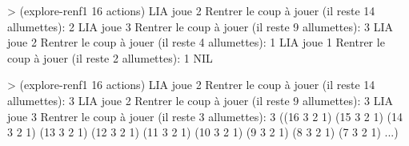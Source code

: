 \documentclass[
]{article}
\newenvironment{Shaded}{}{}
\newcommand{\DecValTok}[1]{\textcolor[rgb]{0.25,0.63,0.44}{#1}}
\newcommand{\NormalTok}[1]{#1}
\newcommand{\OperatorTok}[1]{\textcolor[rgb]{0.40,0.40,0.40}{#1}}
\begin{document}
\begin{Shaded}
    \begin{algorithm}[H]
\begin{Highlighting}[]
\OperatorTok{\textgreater{}}\NormalTok{ (explore{-}renf1 }\DecValTok{16}\NormalTok{ actions)}
\NormalTok{L\textquotesingle{}IA joue }\DecValTok{2} 
\NormalTok{Rentrer le coup à jouer (il reste }\DecValTok{14}\NormalTok{ allumettes): }
\DecValTok{2}
\NormalTok{L\textquotesingle{}IA joue }\DecValTok{3} 
\NormalTok{Rentrer le coup à jouer (il reste }\DecValTok{9}\NormalTok{ allumettes): }
\DecValTok{3}
\NormalTok{L\textquotesingle{}IA joue }\DecValTok{2} 
\NormalTok{Rentrer le coup à jouer (il reste }\DecValTok{4}\NormalTok{ allumettes): }
\DecValTok{1}
\NormalTok{L\textquotesingle{}IA joue }\DecValTok{1} 
\NormalTok{Rentrer le coup à jouer (il reste }\DecValTok{2}\NormalTok{ allumettes): }
\DecValTok{1}
\NormalTok{NIL}
\end{Highlighting}
\end{algorithm}
\end{Shaded}
\pagebreak
\begin{Shaded}
    \begin{algorithm}[H]
    \begin{Highlighting}[]
\OperatorTok{\textgreater{}}\NormalTok{ (explore{-}renf1 }\DecValTok{16}\NormalTok{ actions)}
\NormalTok{L\textquotesingle{}IA joue }\DecValTok{2} 
\NormalTok{Rentrer le coup à jouer (il reste }\DecValTok{14}\NormalTok{ allumettes): }
\DecValTok{3}
\NormalTok{L\textquotesingle{}IA joue }\DecValTok{2} 
\NormalTok{Rentrer le coup à jouer (il reste }\DecValTok{9}\NormalTok{ allumettes): }
\DecValTok{3}
\NormalTok{L\textquotesingle{}IA joue }\DecValTok{3} 
\NormalTok{Rentrer le coup à jouer (il reste }\DecValTok{3}\NormalTok{ allumettes): }
\DecValTok{3}
\NormalTok{((}\DecValTok{16} \DecValTok{3} \DecValTok{2} \DecValTok{1}\NormalTok{) (}\DecValTok{15} \DecValTok{3} \DecValTok{2} \DecValTok{1}\NormalTok{) (}\DecValTok{14} \DecValTok{3} \DecValTok{2} \DecValTok{1}\NormalTok{) (}\DecValTok{13} \DecValTok{3} \DecValTok{2} \DecValTok{1}\NormalTok{) (}\DecValTok{12} \DecValTok{3} \DecValTok{2} \DecValTok{1}\NormalTok{)}
\NormalTok{ (}\DecValTok{11} \DecValTok{3} \DecValTok{2} \DecValTok{1}\NormalTok{) (}\DecValTok{10} \DecValTok{3} \DecValTok{2} \DecValTok{1}\NormalTok{) (}\DecValTok{9} \DecValTok{3} \DecValTok{2} \DecValTok{1}\NormalTok{) (}\DecValTok{8} \DecValTok{3} \DecValTok{2} \DecValTok{1}\NormalTok{) (}\DecValTok{7} \DecValTok{3} \DecValTok{2} \DecValTok{1}\NormalTok{) ...)}
\end{Highlighting}
\end{algorithm}
\end{Shaded}
\end{document}
